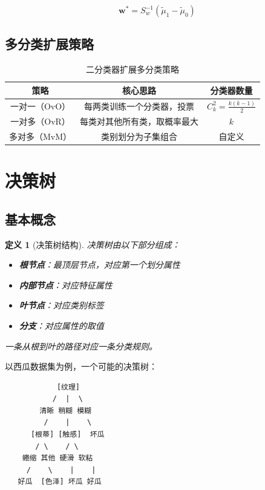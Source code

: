 \documentclass[12pt,a4paper]{ctexart}
\newtheorem{definition}{定义}[section]
\begin{document}
\[
\mathbf{w}^* = S_w^{-1}(\tilde{\mu}_1 - \tilde{\mu}_0)
\]

\subsection{多分类扩展策略}

\begin{table}[H]
\centering
\caption{二分类器扩展多分类策略}
\begin{tabular}{ccc}
\toprule
\textbf{策略} & \textbf{核心思路} & \textbf{分类器数量} \\
\midrule
一对一（OvO） & 每两类训练一个分类器，投票 & $C_k^2 = \frac{k(k-1)}{2}$ \\
一对多（OvR） & 每类对其他所有类，取概率最大 & $k$ \\
多对多（MvM） & 类别划分为子集组合 & 自定义 \\
\bottomrule
\end{tabular}
\end{table}


\section{决策树}

\subsection{基本概念}

\begin{definition}[决策树结构]
决策树由以下部分组成：
\begin{itemize}
    \item \textbf{根节点}：最顶层节点，对应第一个划分属性
    \item \textbf{内部节点}：对应特征属性
    \item \textbf{叶节点}：对应类别标签
    \item \textbf{分支}：对应属性的取值
\end{itemize}
一条从根到叶的路径对应一条分类规则。
\end{definition}

\begin{examplebox}[西瓜数据集决策树示例]
以西瓜数据集为例，一个可能的决策树：
\begin{verbatim}
            [纹理]
           /  |  \
        清晰 稍糊 模糊
         /    |    \
      [根蒂] [触感]  坏瓜
       / \    / \
    蜷缩 其他 硬滑 软粘
     /    \    |    |
   好瓜  [色泽] 坏瓜 好瓜
\end{verbatim}
\end{examplebox}
\end{document}
